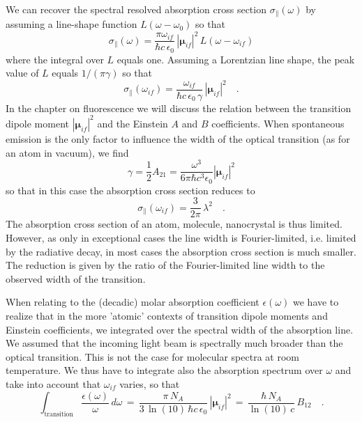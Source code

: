We can recover the spectral resolved absorption cross section $\sigma_{\parallel}(\omega)$ by assuming a line-shape function $L(\omega - \omega_0)$ so that 
\begin{equation}
 \sigma_{\parallel}(\omega) =  \frac{\pi \omega_{if}}{ \hbar c \, \epsilon_0} \,
 |\mathbf{\mu}_{if} |^2 \, L(\omega - \omega_{if})
\end{equation}
where the integral over $L$ equals one. Assuming a Lorentzian line shape, the peak value of $L$ equals $1/(\pi \gamma)$ so that
\begin{equation}
 \sigma_{\parallel}(\omega_{if}) =  \frac{\omega_{if}}{ \hbar c \, \epsilon_0 \, \gamma} \,
 |\mathbf{\mu}_{if} |^2  \quad .
\end{equation}
In the chapter on fluorescence we will discuss the relation between the transition dipole moment $|\mathbf{\mu}_{if} |^2 $ and the Einstein $A$ and $B$ coefficients. When spontaneous emission is the only factor to influence the width of the optical transition (as for an atom in vacuum), we find
\begin{equation}
 \gamma = \frac{1}{2} A_{21} = \frac{\omega^3}{6 \pi \hbar c^3 \epsilon_0} |\mathbf{\mu}_{if} |^2  
\end{equation}
so that in this case the absorption cross section reduces to 
\begin{equation}
 \sigma_{\parallel}(\omega_{if}) =  \frac{3}{2 \pi} \, \lambda^2 \quad .
\end{equation}
The absorption cross section of an atom, molecule, nanocrystal is thus limited. However, as only in exceptional cases the line width is Fourier-limited, i.e. limited by the radiative decay, in most cases the absorption cross section is much smaller. The reduction is given by the ratio of the Fourier-limited line width to the observed width of the transition. 


When relating to the  (decadic) molar absorption coefficient $\epsilon(\omega)$ we have to realize that in the more 'atomic' contexts of transition dipole moments and Einstein coefficients, we integrated over the spectral width of the absorption line. We  assumed that the incoming light beam is spectrally much broader than the optical transition. This is not the case for molecular spectra at room temperature. We thus have to integrate also the absorption spectrum over $\omega$ and take into account that $\omega_{if}$ varies, so that
\begin{equation}
 \int_{\text{transition}} \frac{\epsilon(\omega)}{\omega} \, d \omega \, = \, 
  \frac{\pi \, N_A}{ 3 \, \ln(10) \, \hbar c \, \epsilon_0} \,
 |\mathbf{\mu}_{if} |^2
 \, = \, 
  \frac{\hbar\, N_A}{ \ln(10) \, c } \,
B_{12}  \quad .
\end{equation}





